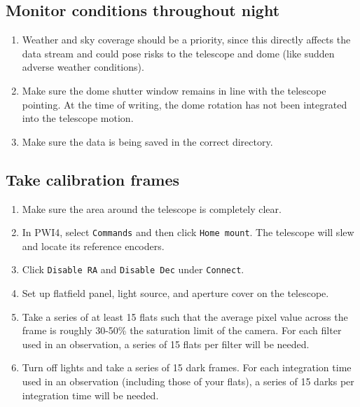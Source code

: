 \documentclass{article}
\begin{document}
	\subsection{Monitor conditions throughout night}
		
		\begin{enumerate}
			
			\item Weather and sky coverage should be a priority, since this directly affects the data stream and could pose risks to the telescope and dome (like sudden adverse weather conditions).
			
			\item Make sure the dome shutter window remains in line with the telescope pointing. At the time of writing, the dome rotation has not been integrated into the telescope motion.
			
			\item Make sure the data is being saved in the correct directory.
			
		\end{enumerate}
		
	\subsection{Take calibration frames}
		
		\begin{enumerate}
			
			\item Make sure the area around the telescope is completely clear.
			
			\item In PWI4, select \texttt{Commands} and then click \texttt{Home mount}. The telescope will slew and locate its reference encoders.
			
			\item Click \texttt{Disable RA} and \texttt{Disable Dec} under \texttt{Connect}.
			
			\item Set up flatfield panel, light source, and aperture cover on the telescope.
			
			\item Take a series of at least 15 flats such that the average pixel value across the frame is roughly 30-50\% the saturation limit of the camera. For each filter used in an observation, a series of 15 flats per filter will be needed.
			
			\item Turn off lights and take a series of 15 dark frames. For each integration time used in an observation (including those of your flats), a series of 15 darks per integration time will be needed.
			
		\end{enumerate}
			
\end{document}
